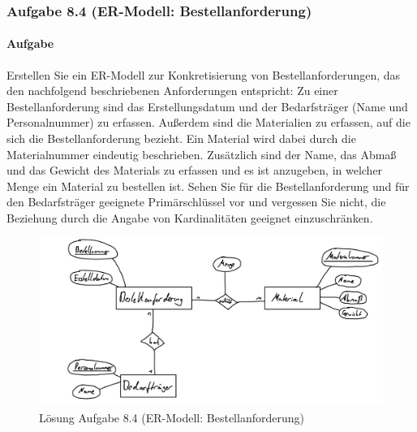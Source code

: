 \subsubsection*{Aufgabe 8.4 (ER-Modell: Bestellanforderung)}
    \paragraph*{Aufgabe}
        Erstellen Sie ein ER-Modell zur Konkretisierung von Bestellanforderungen, das den nachfolgend beschriebenen Anforderungen entspricht:
        Zu einer Bestellanforderung sind das Erstellungsdatum und der Bedarfsträger (Name und Personalnummer) zu erfassen. Außerdem sind die Materialien zu erfassen, auf die sich die Bestellanforderung bezieht. Ein Material wird dabei durch die Materialnummer eindeutig beschrieben. Zusätzlich sind der Name, das Abmaß und das Gewicht des Materials zu erfassen und es ist anzugeben, in welcher Menge ein Material zu bestellen ist. Sehen Sie für die Bestellanforderung und für den Bedarfsträger geeignete Primärschlüssel vor und vergessen Sie nicht, die Beziehung durch die Angabe von Kardinalitäten geeignet einzuschränken.

        \begin{figure}[h]
            \centering
            \includegraphics[width=\textwidth]{image/ER-Modell.png}
            \caption{Lösung Aufgabe 8.4 (ER-Modell: Bestellanforderung)}
            \label{fig:ER-Modell}
        \end{figure}